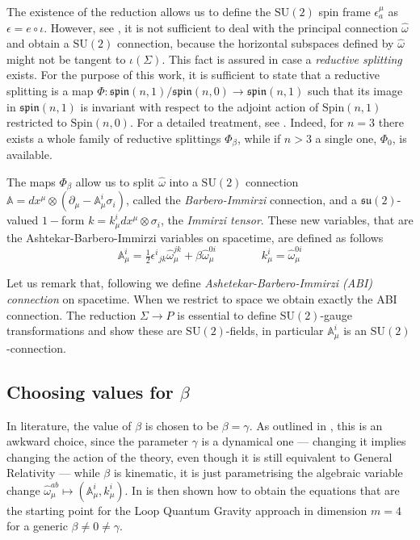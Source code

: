 \documentclass[a4paper, 11pt]{article}
\def\A{\mathbb{A}}
\def\be{\beta}
\def\ga{\gamma}
\def\ep{\epsilon}
\def\io{\iota}
\def\si{\sigma}
\def\om{\omega}
\def\Si{\Sigma}
\def\pa{\partial}
\def\SU(#1){\mathrm{SU}(#1)}
\def\su(#1){\mathfrak{su}(#1)}
\def\spin(#1){\mathfrak{spin}(#1)}
\def\Spin(#1){\mathrm{Spin}(#1)}
\numberwithin{equation}{section}
\begin{document}
The existence of the reduction allows us to define the $\SU(2)$ spin frame $\ep^\mu_a$ as $\ep = e \circ \io$. However, see \cite{orizzonteBarberoImmirziConnectionsHow2021}, it is not sufficient to deal with the principal connection $\hat \om$ and obtain a $\SU(2)$ connection, because the horizontal subspaces defined by $\hat \om$ might not be tangent to $\io(\Si)$. This fact is assured in case a \textit{reductive splitting} exists. For the purpose of this work, it is sufficient to state that a reductive splitting is a map $\Phi: \spin(n,1) / \spin(n, 0) \to \spin(n,1)$ such that its image in $\spin(n,1)$ is invariant with respect to the adjoint action of $\Spin(n,1)$ restricted to $\Spin(n,0)$. For a detailed treatment, see \cite{kobayashiFoundationsDifferentialGeometry1996}. Indeed, for $n = 3$ there exists a whole family of reductive splittings $\Phi_\beta$,  while if $n > 3$ a single one, $\Phi_0$, is available. 

The maps $\Phi_\beta$ allow us to split $\hat\om$ into a $\SU(2)$ connection $\A = dx^\mu \otimes \left(\pa_\mu - \A^i_\mu \si_i\right)$, called the \textit{Barbero-Immirzi} connection, and a $\su(2)$-valued $1-$form $k = k^i_\mu dx^\mu \otimes \si_i$, the \textit{Immirzi tensor}. These new variables, that are the Ashtekar-Barbero-Immirzi variables on spacetime, are defined as follows 
\begin{equation}
    \A^i_\mu = \tfrac 1 2 \ep^i{}_{jk}\hat\om^{jk}_\mu + \be \hat \om^{0i}_\mu%
    \qquad\qquad%
   k^i_\mu = \hat \om^{0i}_\mu
\label{eq:change_om}
\end{equation} 

Let us remark that, following \cite{Fatibene_2007,Fatibene_2007a,orizzonteBarberoImmirziConnectionsHow2021} we define  {\it Ashetekar-Barbero-Immirzi (ABI) connection} on spacetime. When we restrict to space we obtain exactly the ABI connection. The reduction $\Si\to P$ is essential to define $\SU(2)$-gauge transformations and show these are $\SU(2)$-fields, 
in particular $\A^i_\mu$ is an $\SU(2)$-connection. 



\subsection{Choosing values for $\be$}
\label{sec:choosing_beta}

In literature, the value of $\be$ is chosen to be $\be = \ga$. As outlined in \cite{fatibeneLectureNotes1}, this is an awkward choice, since the parameter $\gamma$ is a dynamical one --- changing it implies changing the action of the theory, even though it is still equivalent to General Relativity --- while $\be$ is kinematic, it is just parametrising the algebraic variable change $\hat \om^{ab}_\mu \mapsto \left(\A^i_\mu, k^i_\mu\right)$. In \cite{fatibeneLectureNotes1} is then shown how to obtain the equations that are the starting point for the Loop Quantum Gravity approach in dimension $m = 4$ for a generic $\be \neq 0 \neq  \ga$. 
\end{document}
